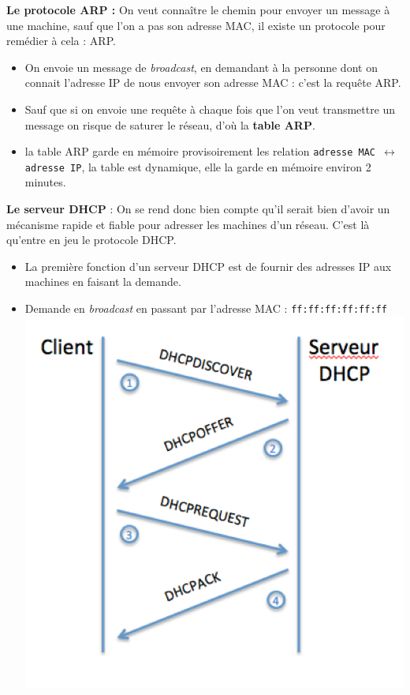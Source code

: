\documentclass[a4paper,9pt, twocolumn]{article}
\begin{document}
	\textbf{Le protocole ARP :} On veut connaître le chemin pour envoyer un message à une machine, sauf que l'on a pas son adresse MAC, il existe un protocole pour remédier à cela : ARP.
	\begin{itemize}
		\item On envoie un message de \emph{broadcast}, en demandant à la personne dont on connait l'adresse IP de nous envoyer son adresse MAC : c'est la requête ARP.
		\item Sauf que si on envoie une requête à chaque fois que l'on veut transmettre un message on risque de saturer le réseau, d'où la \textbf{table ARP}.
		\item la table ARP garde en mémoire provisoirement les relation \texttt{adresse MAC $\longleftrightarrow$ adresse IP}, la table est dynamique, elle la garde en mémoire environ 2 minutes.
		\end{itemize}
		\textbf{Le serveur DHCP} : On se rend donc bien compte qu'il serait bien d'avoir un mécanisme rapide et fiable pour adresser les machines d'un réseau. C'est là qu'entre en jeu le protocole DHCP.
		\begin{itemize}
		\item La première fonction d'un serveur DHCP est de fournir des adresses IP  aux machines en faisant la demande.
		\item Demande en \emph{broadcast} en passant par l'adresse MAC : \texttt{ff:ff:ff:ff:ff:ff}
			\includegraphics[scale=0.4]{dhcp.png}
	\end{itemize}
	
\end{document}
